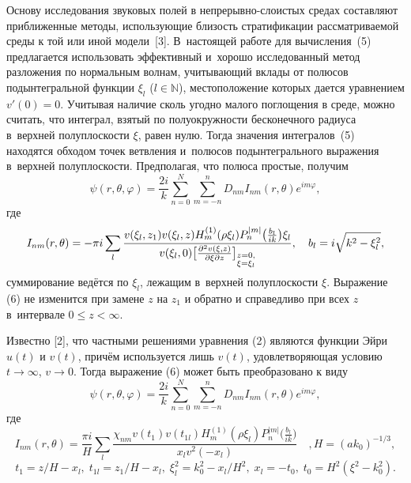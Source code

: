 Основу исследования звуковых полей в непрерывно-слоистых средах
составляют приближенные методы,  использующие близость
стратификации рассматриваемой среды к той или иной модели~[3].
В~настоящей работе для вычисления~(5) предлагается использовать
эффективный и~хорошо исследованный метод разложения по
нормальным волнам,  учитывающий вклады от полюсов
подынтегральной функции $\xi_{l}$   ($l\in \mathbb N$),  местоположение
которых дается уравнением $v'(0)=0$.
Учитывая наличие сколь угодно
малого поглощения в среде,  можно считать,  что интеграл,  взятый по
полуокружности бесконечного радиуса в~верхней полуплоскости $\xi$,
равен нулю.
Тогда значения интегралов~(5) находятся обходом
точек ветвления и~полюсов подынтегрального выражения в~верхней
полуплоскости.
Предполагая,  что полюса простые,  получим
\begin {equation}
\psi(r, \theta, \varphi)=\frac{2i}{k}\sum \limits_{n=0}^{N}\sum
\limits_{m=-n}^{n}D_{nm}I_{nm}(r, \theta)e^{im\varphi},
\end {equation}
где $$I_{nm}(r, \theta)=-\pi i\sum
\limits_{l}^{}
\frac{v(\xi_{l}, z_{1})v(\xi_{l}, z)H_{m}^{(1)}(\rho\xi_{l})P_{n}^{|m|}\bigl(\frac{b_{l}}{ik}\bigr)\xi_{l}}{v(\xi_{l}, 0)
\bigl[\frac{\partial^{2}v(\xi, z)}{\partial\xi\partial z} \bigr]_{
\begin{subarray}{c}
z=0,\\ \xi=\xi_{l}
\end{subarray}
}
},
\quad b_{l}=i\sqrt{k^{2}-\xi_{l}^{2}},
$$
суммирование ведётся по $\xi_{l}$,
лежащим в~верхней полуплоскости $\xi$.
Выражение (6) не изменится при замене $z$
на $z_{1}$ и обратно и справедливо при всех $z$ в~интервале $0\leq z<\infty$.

Известно [2],  что частными решениями уравнения (2) являются функции
Эйри $u(t)$ и $v(t)$,  причём используется лишь $v(t)$,
удовлетворяющая условию $t\rightarrow \infty$,  $v\rightarrow 0$.
Тогда выражение (6) может быть преобразовано к виду
\begin {equation}
\psi(r, \theta, \varphi)=\frac{2i}{k}\sum \limits_{n=0}^{N}\sum
\limits_{m=-n}^{n}D_{nm}I_{nm}(r, \theta)e^{im\varphi},
\end {equation}
где $$I_{nm}(r, \theta)=\displaystyle\frac{\pi
i}{H}\sum\limits_{l}^{}\frac{\chi_{nm}v(t_{1})v(t_{1l})H_{m}^{(1)}(\rho\xi_{l})P_{n}^{|m|}\bigl(\frac{b_{l}}{i k}\bigr)}{x_{l}v^{2}(-x_{l})}\quad,  H=(ak_{0})^{-1/3},$$
$$
t_{1}=z/H-x_{l},\;
t_{1l}=z_{1}/H-x_{l}, \;
\xi_{l}^{2}=k_{0}^{2}-x_{l}/H^{2},\;
x_{l}=-t_{0},\;
t_{0}=H^{2}(\xi^{2}-k_{0}^{2}).$$

